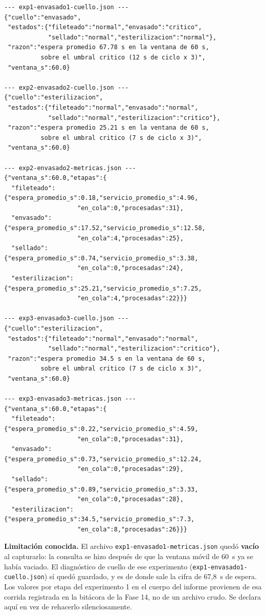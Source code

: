\documentclass[12pt,a4paper]{article}
\begin{document}
\begin{lstlisting}
--- exp1-envasado1-cuello.json ---
{"cuello":"envasado",
 "estados":{"fileteado":"normal","envasado":"critico",
            "sellado":"normal","esterilizacion":"normal"},
 "razon":"espera promedio 67.78 s en la ventana de 60 s,
          sobre el umbral critico (12 s de ciclo x 3)",
 "ventana_s":60.0}

--- exp2-envasado2-cuello.json ---
{"cuello":"esterilizacion",
 "estados":{"fileteado":"normal","envasado":"normal",
            "sellado":"normal","esterilizacion":"critico"},
 "razon":"espera promedio 25.21 s en la ventana de 60 s,
          sobre el umbral critico (7 s de ciclo x 3)",
 "ventana_s":60.0}

--- exp2-envasado2-metricas.json ---
{"ventana_s":60.0,"etapas":{
  "fileteado":     {"espera_promedio_s":0.18,"servicio_promedio_s":4.96,
                    "en_cola":0,"procesadas":31},
  "envasado":      {"espera_promedio_s":17.52,"servicio_promedio_s":12.58,
                    "en_cola":4,"procesadas":25},
  "sellado":       {"espera_promedio_s":0.74,"servicio_promedio_s":3.38,
                    "en_cola":0,"procesadas":24},
  "esterilizacion":{"espera_promedio_s":25.21,"servicio_promedio_s":7.25,
                    "en_cola":4,"procesadas":22}}}

--- exp3-envasado3-cuello.json ---
{"cuello":"esterilizacion",
 "estados":{"fileteado":"normal","envasado":"normal",
            "sellado":"normal","esterilizacion":"critico"},
 "razon":"espera promedio 34.5 s en la ventana de 60 s,
          sobre el umbral critico (7 s de ciclo x 3)",
 "ventana_s":60.0}

--- exp3-envasado3-metricas.json ---
{"ventana_s":60.0,"etapas":{
  "fileteado":     {"espera_promedio_s":0.22,"servicio_promedio_s":4.59,
                    "en_cola":0,"procesadas":31},
  "envasado":      {"espera_promedio_s":0.73,"servicio_promedio_s":12.24,
                    "en_cola":0,"procesadas":29},
  "sellado":       {"espera_promedio_s":0.89,"servicio_promedio_s":3.33,
                    "en_cola":0,"procesadas":28},
  "esterilizacion":{"espera_promedio_s":34.5,"servicio_promedio_s":7.3,
                    "en_cola":8,"procesadas":26}}}
\end{lstlisting}

\textbf{Limitación conocida.} El archivo
\texttt{exp1-envasado1-metricas.json} quedó \textbf{vacío} al capturarlo: la
consulta se hizo después de que la ventana móvil de 60~s ya se había vaciado.
El diagnóstico de cuello de ese experimento (\texttt{exp1-envasado1-cuello.json})
sí quedó guardado, y es de donde sale la cifra de 67,8~s de espera. Los valores
por etapa del experimento 1 en el cuerpo del informe provienen de esa corrida
registrada en la bitácora de la Fase 14, no de un archivo crudo. Se declara
aquí en vez de rehacerlo silenciosamente.
\end{document}
